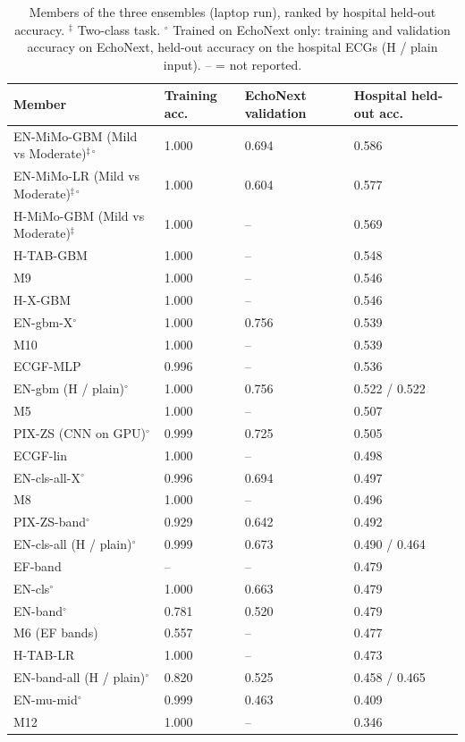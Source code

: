 \begin{table}[htbp]
\centering
\caption{Members of the three ensembles (laptop run), ranked by hospital held-out accuracy. $^{\ddagger}$ Two-class task. $^{\circ}$ Trained on EchoNext only: training and validation accuracy on EchoNext, held-out accuracy on the hospital ECGs (H / plain input). -- = not reported.}\label{tab:echonext_members}
\footnotesize
\begin{tabular}{>{\raggedright\arraybackslash\hspace{0pt}}p{}>{\raggedright\arraybackslash\hspace{0pt}}p{}>{\raggedright\arraybackslash\hspace{0pt}}p{}>{\raggedright\arraybackslash\hspace{0pt}}p{}}
\toprule
\textbf{Member} & \textbf{Training acc.} & \textbf{EchoNext validation} & \textbf{Hospital held-out acc.} \\
\midrule
EN-MiMo-GBM (Mild vs Moderate)$^{\ddagger\circ}$ & 1.000 & 0.694 & 0.586 \\
EN-MiMo-LR (Mild vs Moderate)$^{\ddagger\circ}$ & 1.000 & 0.604 & 0.577 \\
H-MiMo-GBM (Mild vs Moderate)$^{\ddagger}$ & 1.000 & -- & 0.569 \\
H-TAB-GBM & 1.000 & -- & 0.548 \\
M9 & 1.000 & -- & 0.546 \\
H-X-GBM & 1.000 & -- & 0.546 \\
EN-gbm-X$^{\circ}$ & 1.000 & 0.756 & 0.539 \\
M10 & 1.000 & -- & 0.539 \\
ECGF-MLP & 0.996 & -- & 0.536 \\
EN-gbm (H / plain)$^{\circ}$ & 1.000 & 0.756 & 0.522 / 0.522 \\
M5 & 1.000 & -- & 0.507 \\
PIX-ZS (CNN on GPU)$^{\circ}$ & 0.999 & 0.725 & 0.505 \\
ECGF-lin & 1.000 & -- & 0.498 \\
EN-cls-all-X$^{\circ}$ & 0.996 & 0.694 & 0.497 \\
M8 & 1.000 & -- & 0.496 \\
PIX-ZS-band$^{\circ}$ & 0.929 & 0.642 & 0.492 \\
EN-cls-all (H / plain)$^{\circ}$ & 0.999 & 0.673 & 0.490 / 0.464 \\
EF-band & -- & -- & 0.479 \\
EN-cls$^{\circ}$ & 1.000 & 0.663 & 0.479 \\
EN-band$^{\circ}$ & 0.781 & 0.520 & 0.479 \\
M6 (EF bands) & 0.557 & -- & 0.477 \\
H-TAB-LR & 1.000 & -- & 0.473 \\
EN-band-all (H / plain)$^{\circ}$ & 0.820 & 0.525 & 0.458 / 0.465 \\
EN-mu-mid$^{\circ}$ & 0.999 & 0.463 & 0.409 \\
M12 & 1.000 & -- & 0.346 \\
\bottomrule
\end{tabular}
\end{table}
